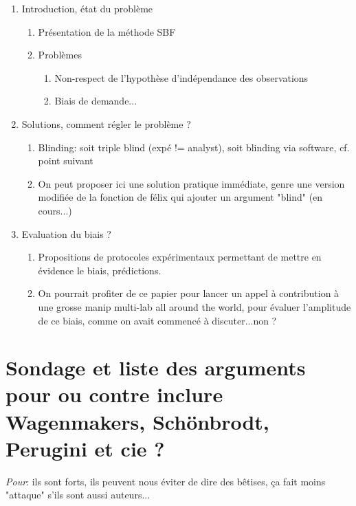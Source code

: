 \documentclass[a4paper,man,natbib]{apa6}
\begin{document}
\renewcommand{\labelenumii}{\Roman{enumii}}
\begin{enumerate}
	\item{Introduction, état du problème}
	\begin{enumerate}
		\item{Présentation de la méthode SBF}
		\item{Problèmes}
			\begin{enumerate}
            \item{Non-respect de l'hypothèse d'indépendance des observations}
            \item{Biais de demande...}
            \end{enumerate}
            \end{enumerate}
            \item{Solutions, comment régler le problème ?}
            \begin{enumerate}
            \item{Blinding: soit triple blind (expé != analyst), soit blinding via software, cf. point suivant}
            \item{On peut proposer ici une solution pratique immédiate, genre une version modifiée de la fonction de félix qui ajouter un argument "blind" (en cours...)}
            \end{enumerate}
            \item{Evaluation du biais ?}
            \begin{enumerate}
            \item{Propositions de protocoles expérimentaux permettant de mettre en évidence le biais, prédictions.}
            \item{On pourrait profiter de ce papier pour lancer un appel à contribution à une grosse manip multi-lab all around the world, pour évaluer l'amplitude de ce biais, comme on avait commencé à discuter...non ?}

\end{enumerate}
\end{enumerate}


\section{Sondage et liste des arguments pour ou contre inclure Wagenmakers, Schönbrodt, Perugini et cie ?}

\emph{Pour}: ils sont forts, ils peuvent nous éviter de dire des bêtises, ça fait moins "attaque" s'ils sont aussi auteurs...	
\end{document}
